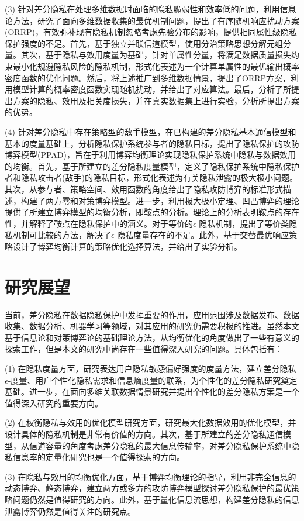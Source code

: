 (3) 针对差分隐私在处理多维数据时面临的隐私脆弱性和效率低的问题，利用信息论方法，研究了面向多维数据收集的最优机制问题，提出了有序随机响应扰动方案(ORRP)，有效弥补现有隐私机制忽略考虑先验分布的影响，提供相同属性级隐私保护强度的不足。首先，基于独立并联信道模型，使用分治策略思想分解元组分量。其次，基于隐私与效用度量为基础，针对单属性分量，将满足数据质量损失约束最小化规避隐私风险的隐私机制，形式化表述为一个计算单属性的最优输出概率密度函数的优化问题。然后，将上述推广到多维数据情景，提出了ORRP方案，利用模型计算的概率密度函数实现随机扰动，并给出了对应算法。最后，分析了所提出方案的隐私、效用及相关度损失，并在真实数据集上进行实验，分析所提出方案的优势。


(4) 针对差分隐私中存在策略型的敌手模型，在已构建的差分隐私基本通信模型和基本的度量基础上，分析隐私保护系统参与者的隐私目标，提出了隐私保护的攻防博弈模型(PPAD)，旨在于利用博弈均衡理论实现隐私保护系统中隐私与数据效用的均衡。首先，基于所建立的差分隐私度量模型，定义了隐私保护系统中隐私保护者和隐私攻击者(敌手)的隐私目标，形式化表述为有关隐私泄露的极大极小问题。其次，从参与者、策略空间、效用函数的角度给出了隐私攻防博弈的标准形式描述，构建了两方零和对策博弈模型。进一步，利用极大极小定理、凹凸博弈的理论提供了所建立博弈模型的均衡分析，即鞍点的分析。理论上的分析表明鞍点的存在性，并解释了鞍点在隐私保护中的涵义。对于等价的$\epsilon$-隐私机制，提出了等价类隐私机制可比较的方法，解决了$\epsilon$-隐私度量存在的不足。此外，基于交替最优响应策略设计了博弈均衡计算的策略优化选择算法，并给出了实验分析。

\section{研究展望}

当前，差分隐私在数据隐私保护中发挥重要的作用，应用范围涉及数据发布、数据收集、数据分析、机器学习等领域，对其应用的研究仍需要积极的推进。虽然本文基于信息论和对策博弈论的基础理论方法，从均衡优化的角度做出了一些有意义的探索工作，但是本文的研究中尚存在一些值得深入研究的问题。具体包括有：

(1) 在隐私度量方面，研究表达用户隐私敏感偏好强度的度量方法，建立差分隐私$\epsilon$-度量、用户个性化隐私需求和信息熵度量的联系，为个性化的差分隐私研究奠定基础。进一步，在面向多维关联数据情景研究并提出个性化的差分隐私方案是一个值得深入研究的重要方向。

(2) 在权衡隐私与效用的优化模型研究方面，研究最大化数据效用的优化模型，并设计具体的隐私机制是非常有价值的方向。其次，基于所建立的差分隐私通信模型，从信道容量的角度考虑差分隐私的最大信息传输率，对差分隐私保护系统中隐私信息率的定量化研究也是一个值得探索的方向。


(3) 在隐私与效用的均衡优化方面，基于博弈均衡理论的指导，利用非完全信息的动态博弈、静态博弈，建立两方或多方的攻防博弈模型探讨差分隐私保护的最优策略问题仍然是值得研究的方向。此外，基于量化信息流思想，构建差分隐私的信息泄露博弈仍然是值得关注的研究点。


